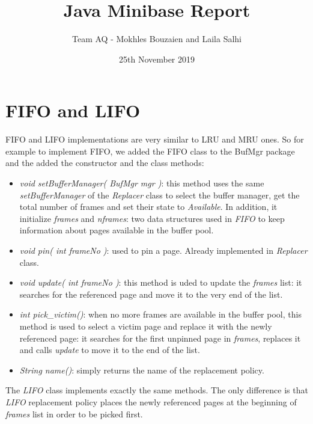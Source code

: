 \documentclass{article}
\title{Java Minibase Report}
\author{Team AQ - Mokhles Bouzaien and Laila Salhi}
\date{25th November 2019}
\begin{document}
\maketitle

\section{FIFO and LIFO}
FIFO and LIFO implementations are very similar to LRU and MRU ones. So for example to implement FIFO, we added the FIFO class to the BufMgr package and the added the constructor and the class methods:
\begin{itemize}
	\item \textit{void setBufferManager( BufMgr mgr )}: this method uses the same \textit{setBufferManager} of the \textit{Replacer} class to select the buffer manager, get the total number of frames and set their state to \textit{Available}. In addition, it initialize \textit{frames} and \textit{nframes}: two data structures used in \textit{FIFO} to keep information about pages available in the buffer pool.
	\item \textit{void pin( int frameNo )}: used to pin a page. Already implemented in \textit{Replacer} class.
	\item \textit{void update( int frameNo )}: this method is uded to update the \textit{frames} list: it searches for the referenced page and move it to the very end of the list.
	\item \textit{int pick\_victim()}: when no more frames are available in the buffer pool, this method is used to select a victim page and replace it with the newly referenced page: it searches for the first unpinned page in \textit{frames}, replaces it and calls \textit{update} to move it to the end of the list.
	\item \textit{String name()}: simply returns the name of the replacement policy.
\end{itemize}
The \textit{LIFO} class implements exactly the same methods. The only difference is that \textit{LIFO} replacement policy places the newly referenced pages at the beginning of \textit{frames} list in order to be picked first.
\end{document}
